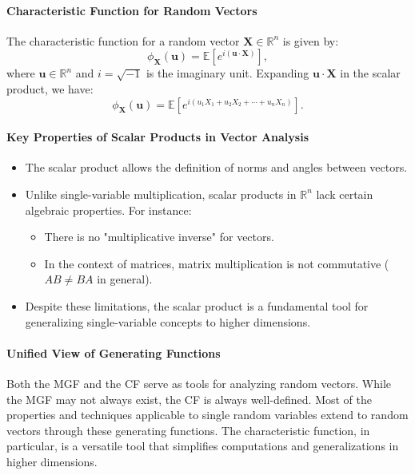 \paragraph{Characteristic Function for Random Vectors}
The characteristic function for a random vector \( \mathbf{X} \in \mathbb{R}^n \) is given by:
\[
\phi_{\mathbf{X}}(\mathbf{u}) = \mathbb{E}\left[e^{i (\mathbf{u} \cdot \mathbf{X})}\right],
\]
where \( \mathbf{u} \in \mathbb{R}^n \) and \( i = \sqrt{-1} \) is the imaginary unit. Expanding \( \mathbf{u} \cdot \mathbf{X} \) in the scalar product, we have:
\[
\phi_{\mathbf{X}}(\mathbf{u}) = \mathbb{E}\left[e^{i(u_1 X_1 + u_2 X_2 + \cdots + u_n X_n)}\right].
\]

\paragraph{Key Properties of Scalar Products in Vector Analysis}
\begin{itemize}
    \item The scalar product allows the definition of norms and angles between vectors.
    \item Unlike single-variable multiplication, scalar products in \( \mathbb{R}^n \) lack certain algebraic properties. For instance:
        \begin{itemize}
            \item There is no "multiplicative inverse" for vectors.
            \item In the context of matrices, matrix multiplication is not commutative (\( AB \neq BA \) in general).
        \end{itemize}
    \item Despite these limitations, the scalar product is a fundamental tool for generalizing single-variable concepts to higher dimensions.
\end{itemize}

\paragraph{Unified View of Generating Functions}
Both the MGF and the CF serve as tools for analyzing random vectors. While the MGF may not always exist, the CF is always well-defined. Most of the properties and techniques applicable to single random variables extend to random vectors through these generating functions. The characteristic function, in particular, is a versatile tool that simplifies computations and generalizations in higher dimensions.

